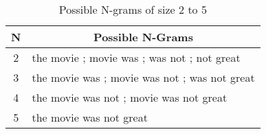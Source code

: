 		\begin{table}[h]	
			\begin{center}
				\begin{tabular}{c l} 
					\hline\hline
					N &  \multicolumn{1}{c}{Possible N-Grams }  \\ 
					\hline
					2 & the movie ; movie was ; was not ; not great  \\
					3 & the movie was ; movie was not ; was not great \\
					4 & the movie was not ; movie was not great \\
					5 & the movie was not great \\ 
					\hline\hline
				\end{tabular}
			\end{center}
			\caption[N-Gram Example]{Possible N-grams of size 2 to 5 }
			\label{table:ngrams}
		\end{table}
		
		
